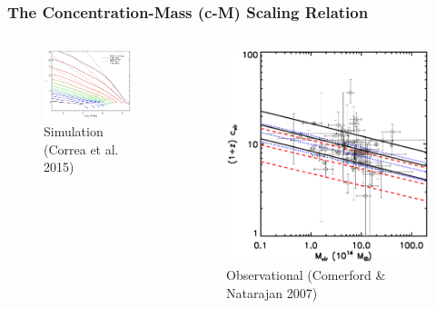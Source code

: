 \documentclass[hyperref={pdfpagelabels=false}]{beamer}
\begin{document}
\begin{frame}
  \frametitle{ The Concentration-Mass (c-M) Scaling Relation}
  \begin{columns}
    \begin{column}{0.55\textwidth}
      \begin{figure}
        \includegraphics[width=\textwidth]{Correa_CM_Relation.png}
        \caption{Simulation {\tiny (Correa et al. 2015)}}
      \end{figure}
      
    \end{column}
    \begin{column}{0.45\textwidth}
      \begin{figure}
        \includegraphics[width=\textwidth]{cn07.eps}
        \caption{Observational {\tiny (Comerford \& Natarajan 2007)}}
      \end{figure}
    \end{column}
  \end{columns}
\end{frame}
\end{document}
